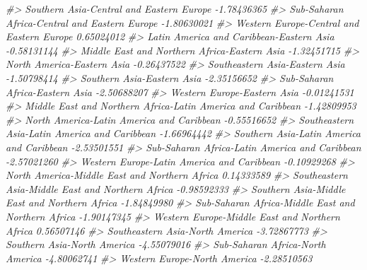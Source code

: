 \documentclass[
]{book}
\newenvironment{Shaded}{\begin{snugshade}}{\end{snugshade}}
\newcommand{\CommentTok}[1]{\textcolor[rgb]{0.56,0.35,0.01}{\textit{#1}}}
\theoremstyle{definition}
\theoremstyle{definition}
\theoremstyle{definition}
\theoremstyle{definition}
\theoremstyle{remark}
\begin{document}
\begin{Shaded}
\begin{Highlighting}[]
\CommentTok{\#\textgreater{} Southern Asia{-}Central and Eastern Europe                    {-}1.78436365}
\CommentTok{\#\textgreater{} Sub{-}Saharan Africa{-}Central and Eastern Europe               {-}1.80630021}
\CommentTok{\#\textgreater{} Western Europe{-}Central and Eastern Europe                    0.65024012}
\CommentTok{\#\textgreater{} Latin America and Caribbean{-}Eastern Asia                    {-}0.58131144}
\CommentTok{\#\textgreater{} Middle East and Northern Africa{-}Eastern Asia                {-}1.32451715}
\CommentTok{\#\textgreater{} North America{-}Eastern Asia                                  {-}0.26437522}
\CommentTok{\#\textgreater{} Southeastern Asia{-}Eastern Asia                              {-}1.50798414}
\CommentTok{\#\textgreater{} Southern Asia{-}Eastern Asia                                  {-}2.35156652}
\CommentTok{\#\textgreater{} Sub{-}Saharan Africa{-}Eastern Asia                             {-}2.50688207}
\CommentTok{\#\textgreater{} Western Europe{-}Eastern Asia                                 {-}0.01241531}
\CommentTok{\#\textgreater{} Middle East and Northern Africa{-}Latin America and Caribbean {-}1.42809953}
\CommentTok{\#\textgreater{} North America{-}Latin America and Caribbean                   {-}0.55516652}
\CommentTok{\#\textgreater{} Southeastern Asia{-}Latin America and Caribbean               {-}1.66964442}
\CommentTok{\#\textgreater{} Southern Asia{-}Latin America and Caribbean                   {-}2.53501551}
\CommentTok{\#\textgreater{} Sub{-}Saharan Africa{-}Latin America and Caribbean              {-}2.57021260}
\CommentTok{\#\textgreater{} Western Europe{-}Latin America and Caribbean                  {-}0.10929268}
\CommentTok{\#\textgreater{} North America{-}Middle East and Northern Africa                0.14333589}
\CommentTok{\#\textgreater{} Southeastern Asia{-}Middle East and Northern Africa           {-}0.98592333}
\CommentTok{\#\textgreater{} Southern Asia{-}Middle East and Northern Africa               {-}1.84849980}
\CommentTok{\#\textgreater{} Sub{-}Saharan Africa{-}Middle East and Northern Africa          {-}1.90147345}
\CommentTok{\#\textgreater{} Western Europe{-}Middle East and Northern Africa               0.56507146}
\CommentTok{\#\textgreater{} Southeastern Asia{-}North America                             {-}3.72867773}
\CommentTok{\#\textgreater{} Southern Asia{-}North America                                 {-}4.55079016}
\CommentTok{\#\textgreater{} Sub{-}Saharan Africa{-}North America                            {-}4.80062741}
\CommentTok{\#\textgreater{} Western Europe{-}North America                                {-}2.28510563}

\end{Highlighting}
\end{Shaded}
\end{document}
